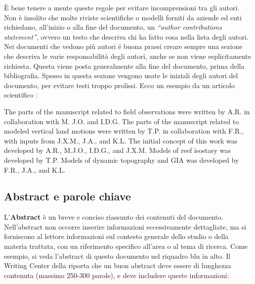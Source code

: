 \documentclass[9pt,a4paper,twoside]{rho-class/rho}
\begin{document}
È bene tenere a mente queste regole per evitare incomprensioni tra gli autori. Non è insolito che molte riviste scientifiche o modelli forniti da aziende ed enti richiedano, all’inizio o alla fine del documento, un \textit{“author contributions statement”}, ovvero un testo che descriva chi ha fatto cosa nella lista degli autori. Nei documenti che vedono più autori é buona prassi creare sempre una sezione che descriva le varie responsabilità degli autori, anche se non viene esplicitamente richiesta. Questa viene posta generalmente alla fine del documento, prima della bibliografia. Spesso in questa sezione vengono usate le iniziali degli autori del documento, per evitare testi troppo prolissi. Ecco un esempio da un articolo scientifico \parencite{rovere_influence_2023}:

\begin{info}
The parts of the manuscript related to field observations were written by A.R. in collaboration with M. J.O. and I.D.G. The parts of the manuscript related to modeled vertical land motions were written by T.P. in collaboration with F.R., with inputs from J.X.M., J.A., and K.L. The initial concept of this work was developed by A.R., M.J.O., I.D.G., and J.X.M. Models of reef isostasy was developed by T.P. Models of dynamic topography and GIA was developed by F.R., J.A., and K.L.
\end{info}

\subsection{Abstract e parole chiave}
L’\textbf{Abstract} è un breve e conciso riassunto dei contenuti del documento. Nell’abstract non occorre inserire informazioni eccessivamente dettagliate, ma si forniscono al lettore informazioni sul contesto generale dello studio o della materia trattata, con un riferimento specifico all'area o al tema di ricerca. Come esempio, si veda l’abstract di questo documento nel riquadro blu in alto. Il Writing Center della \textcite{abstract} riporta che un buon abstract deve essere di lunghezza contenuta (massimo 250-300 parole), e deve includere queste informazioni: 
\end{document}
